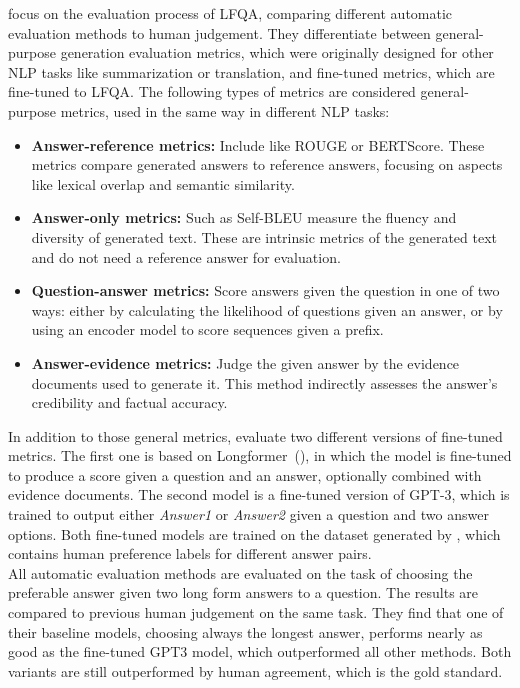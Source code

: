 \cite{xu:2023} focus on the evaluation process of LFQA, comparing different automatic evaluation methods to human judgement.
They differentiate between general-purpose generation evaluation metrics, which were originally designed for other NLP tasks like summarization or translation, and fine-tuned metrics, which are fine-tuned to LFQA.
The following types of metrics are considered general-purpose metrics, used in the same way in different NLP tasks:
\begin{itemize}
\item \textbf{Answer-reference metrics:} Include like ROUGE or BERTScore. These metrics compare generated answers to reference answers, focusing on aspects like lexical overlap and semantic similarity.
\item \textbf{Answer-only metrics:} Such as Self-BLEU measure the fluency and diversity of generated text. These are intrinsic metrics of the generated text and do not need a reference answer for evaluation.
\item \textbf{Question-answer metrics:} Score answers given the question in one of two ways: either by calculating the likelihood of questions given an answer, or by using an encoder model to score sequences given a prefix.
\item \textbf{Answer-evidence metrics:} Judge the given answer by the evidence documents used to generate it. This method indirectly assesses the answer's credibility and factual accuracy.
\end{itemize}
In addition to those general metrics, \cite{xu:2023} evaluate two different versions of fine-tuned metrics.
The first one is based on Longformer~(\cite{beltagy:2020}), in which the model is fine-tuned to produce a score given a question and an answer, optionally combined with evidence documents.
The second model is a fine-tuned version of GPT-3, which is trained to output either \emph{Answer1} or \emph{Answer2} given a question and two answer options.
Both fine-tuned models are trained on the dataset generated by \cite{nakano:2021}, which contains human preference labels for different answer pairs.
\\
All automatic evaluation methods are evaluated on the task of choosing the preferable answer given two long form answers to a question.
The results are compared to previous human judgement on the same task.
They find that one of their baseline models, choosing always the longest answer, performs nearly as good as the fine-tuned GPT3 model, which outperformed all other methods.
Both variants are still outperformed by human agreement, which is the gold standard.
